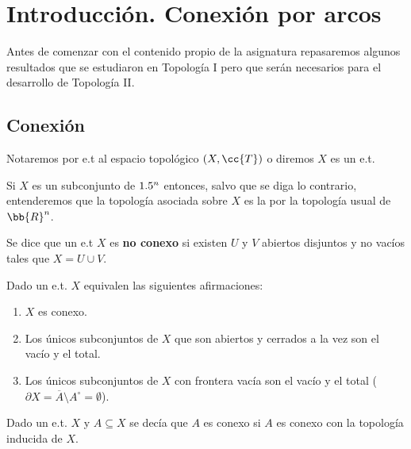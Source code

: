 \chapter*{Introducción. Conexión por arcos}

Antes de comenzar con el contenido propio de la asignatura repasaremos algunos resultados que se estudiaron en Topología I pero que serán necesarios para el desarrollo de Topología II.

\section{Conexión}

\begin{notacion}
    Notaremos por e.t al espacio topológico $(X,\cc{T})$ o diremos $X$ es un e.t.
\end{notacion}

\begin{observacion}
    Si $X$ es un subconjunto de $1.5^n$ entonces, salvo que se diga lo contrario, entenderemos que la topología asociada sobre $X$ es la  por la topología usual de $\bb{R}^n$.
\end{observacion}

\begin{definicion} 
    Se dice que un e.t $X$ es \textbf{no conexo} si existen $U$ y $V$ abiertos disjuntos y no vacíos tales que $X=U\cup V$. 
\end{definicion}

\begin{prop}
    Dado un e.t. $X$ equivalen las siguientes afirmaciones:
    \begin{enumerate}
        \item[(i)] $X$ es conexo.
        \item[(ii)] Los únicos subconjuntos de $X$ que son abiertos y cerrados a la vez son el vacío y el total. 
        \item[(iii)] Los únicos subconjuntos de $X$ con frontera vacía son el vacío y el total \newline ($\partial X = \overline{A}\setminus A^\circ =\emptyset$).
    \end{enumerate}
\end{prop}

\begin{observacion}
    Dado un e.t. $X$ y $A\subseteq X$ se decía que $A$ es conexo si $A$ es conexo con la topología inducida de $X$.
\end{observacion}

